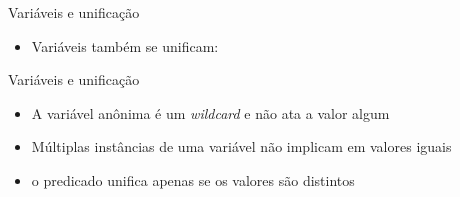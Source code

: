 \begin{frame}[fragile]{Variáveis e unificação}

    \begin{itemize}
        \item Variáveis também se unificam:


    \end{itemize}

\end{frame}

\begin{frame}[fragile]{Variáveis e unificação}

    \begin{itemize}
        \item A variável anônima é um \textit{wildcard} e não ata a valor algum

        \item Múltiplas instâncias de uma variável não implicam em valores iguais

        \item o predicado  unifica apenas se os valores são distintos

    \end{itemize}

\end{frame}
